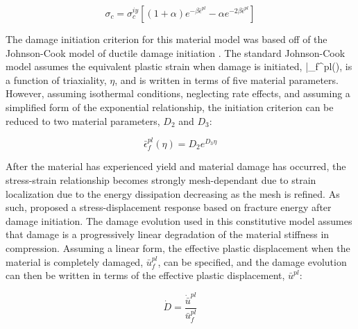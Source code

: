 \begin{equation}
\sigma_c=\sigma_c^{iy}\left [ \left ( 1+\alpha \right ) e^{-\beta\bar{\epsilon}^{pl}}-\alpha e^{-2\beta\bar{\epsilon}^{pl}}  \right ]
\label{eqn:param2-1}
\end{equation}

The damage initiation criterion for this material model was based off of the Johnson-Cook model of ductile damage initiation \cite{Johnson_1985}. The standard Johnson-Cook model assumes the equivalent plastic strain when damage is initiated, \bar{\epsilon}_{f}^{pl}\left(\eta\right), is a function of triaxiality, $\eta$, and is written in terms of five material parameters. However, assuming isothermal conditions, neglecting rate effects, and assuming a simplified form of the exponential relationship, the initiation criterion can be reduced to two material parameters, $D_2$ and $D_3$:

\begin{equation}
\bar{\epsilon}_{f}^{pl}\left(\eta\right)=D_{2}e^{D_{3}\eta}\label{eqn:druc8}
\end{equation}

After the material has experienced yield and material damage has occurred, the stress-strain relationship becomes strongly mesh-dependant due to strain localization due to the energy dissipation decreasing as the mesh is refined. As such, \citet{Hillerborg_1976} proposed a stress-displacement response based on fracture energy after damage initiation. The damage evolution used in this constitutive model assumes that damage is a progressively linear degradation of the material stiffness in compression. Assuming a linear form, the effective plastic displacement when the material is completely damaged, $\bar{u}^{pl}_f$, can be specified, and the damage evolution can then be written in terms of the effective plastic displacement, $\bar{u}^{pl}$:

\begin{equation}
\dot{D}=\frac{\dot{\bar{u}}^{pl}}{\bar{u}_{f}^{pl}}\label{eqn:druc9-1}
\end{equation}

